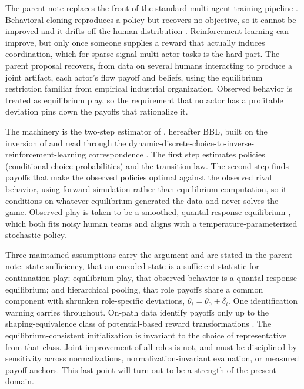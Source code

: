 \documentclass[11pt]{article}
\theoremstyle{definition}
\begin{document}
The parent note replaces the front of the standard multi-agent training pipeline \citep{golden2026struct}. Behavioral cloning reproduces a policy but recovers no objective, so it cannot be improved and it drifts off the human distribution \citep{rossGordonBagnell2011}. Reinforcement learning can improve, but only once someone supplies a reward that actually induces coordination, which for sparse-signal multi-actor tasks is the hard part. The parent proposal recovers, from data on several humans interacting to produce a joint artifact, each actor's flow payoff and beliefs, using the equilibrium restriction familiar from empirical industrial organization. Observed behavior is treated as equilibrium play, so the requirement that no actor has a profitable deviation pins down the payoffs that rationalize it.

The machinery is the two-step estimator of \citet{bbl2007}, hereafter BBL, built on the inversion of \citet{hotzMiller1993} and read through the dynamic-discrete-choice-to-inverse-reinforcement-learning correspondence \citep{ziebart2008}. The first step estimates policies (conditional choice probabilities) and the transition law. The second step finds payoffs that make the observed policies optimal against the observed rival behavior, using forward simulation rather than equilibrium computation, so it conditions on whatever equilibrium generated the data and never solves the game. Observed play is taken to be a smoothed, quantal-response equilibrium \citep{mckelveyPalfrey1995}, which both fits noisy human teams and aligns with a temperature-parameterized stochastic policy.

Three maintained assumptions carry the argument and are stated in the parent note: state sufficiency, that an encoded state is a sufficient statistic for continuation play; equilibrium play, that observed behavior is a quantal-response equilibrium; and hierarchical pooling, that role payoffs share a common component with shrunken role-specific deviations, $\theta_i = \theta_0 + \delta_i$. One identification warning carries throughout. On-path data identify payoffs only up to the shaping-equivalence class of potential-based reward transformations \citep{ngHaradaRussell1999, magnacThesmar2002, kss2021}. The equilibrium-consistent initialization is invariant to the choice of representative from that class. Joint improvement of all roles is not, and must be disciplined by sensitivity across normalizations, normalization-invariant evaluation, or measured payoff anchors. This last point will turn out to be a strength of the present domain.
\end{document}
